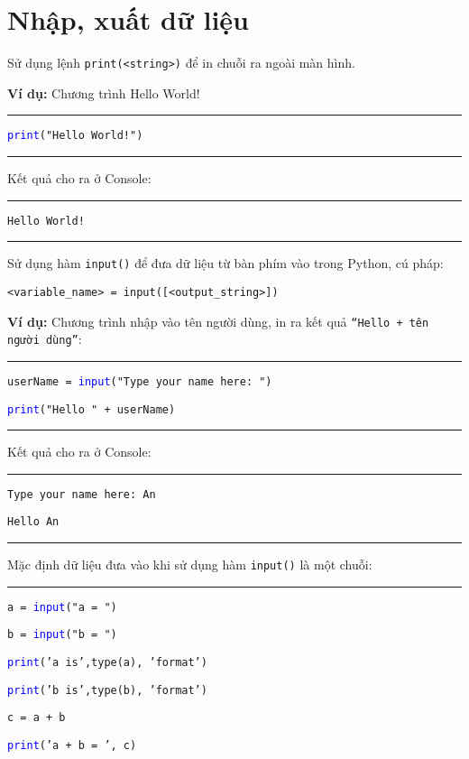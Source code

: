 \section{Nhập, xuất dữ liệu}
Sử dụng lệnh \texttt{print(<string>)} để in chuỗi ra ngoài màn hình.\par
\textbf{Ví dụ:} Chương trình Hello World!\\
\rule{\linewidth}{0.2mm}\par
\begin{linenumbers}
	\texttt{\textcolor{blue}{print}("Hello World!")}
\end{linenumbers}
\rule{\linewidth}{0.2mm}\par
\noindent
\resetlinenumber
Kết quả cho ra ở Console:\\
\rule{\linewidth}{0.2mm}\par
\begin{linenumbers}
	\texttt{Hello World!}
\end{linenumbers}
\rule{\linewidth}{0.2mm}
\resetlinenumber
\newpage
Sử dụng hàm \texttt{input()} để đưa dữ liệu từ bàn phím vào trong Python, cú pháp:
\begin{center}
	\texttt{<variable\_name> = input([<output\_string>])}
\end{center}
\textbf{Ví dụ:} Chương trình nhập vào tên người dùng, in ra kết quả \texttt{“Hello + tên người dùng”}:\\
\rule{\linewidth}{0.2mm}\par
\begin{linenumbers}
	\texttt{userName = \textcolor{blue}{input}("Type your name here: ")}\par
	\texttt{\textcolor{blue}{print}("Hello " + userName)}
\end{linenumbers}
\rule{\linewidth}{0.2mm}\par
\noindent
\resetlinenumber
Kết quả cho ra ở Console:\\
\rule{\linewidth}{0.2mm}\par
\begin{linenumbers}
	\texttt{Type your name here: An}\par
	\texttt{Hello An}
\end{linenumbers}
\rule{\linewidth}{0.2mm}\par
\resetlinenumber
\newpage
Mặc định dữ liệu đưa vào khi sử dụng hàm \texttt{input()} là một chuỗi:\\
\rule{\linewidth}{0.2mm}\par
\begin{linenumbers}
	\texttt{a = \textcolor{blue}{input}("a = ")}\par
	\texttt{b = \textcolor{blue}{input}("b = ")}\par
	\texttt{\textcolor{blue}{print}('a is',type(a), 'format')}\par
	\texttt{\textcolor{blue}{print}('b is',type(b), 'format')}\par
	\texttt{c = a + b}\par
	\texttt{\textcolor{blue}{print}('a + b = ', c)}\par
\end{linenumbers}
